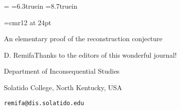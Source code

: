 



\magnification=
\baselineskip=12pt
\hsize=6.3truein
\vsize=8.7truein


\font\bigrm=cmr12 at 24pt
\centerline{\bigrm An elementary proof of the reconstruction conjecture}
\bigskip\bigskip

\centerline{D. RemifaThanks to
  the editors of this wonderful journal!}
\smallskip
\centerline{Department of Inconsequential Studies}
\centerline{Solatido College, North Kentucky, USA}
\centerline{\tt remifa@dis.solatido.edu}









\bye
